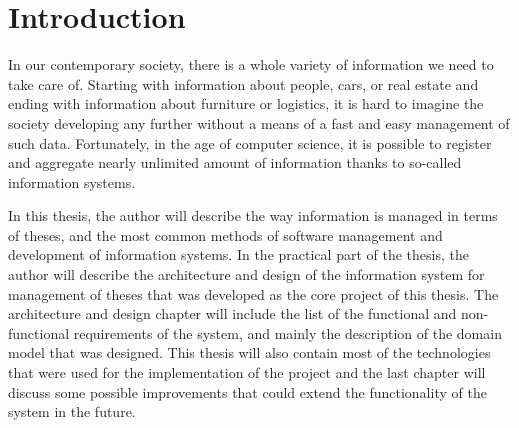 \chapter{Introduction}

In our contemporary society, there is a whole variety of information we need to take care of. Starting with information about people, cars, or real estate and ending with information about furniture or logistics, it is hard to imagine the society developing any further without a means of a fast and easy management of such data. Fortunately, in the age of computer science, it is possible to register and aggregate nearly unlimited amount of information thanks to so-called information systems.

In this thesis, the author will describe the way information is managed in terms of theses, and the most common methods of software management and development of information systems. In the practical part of the thesis, the author will describe the architecture and design of the information system for management of theses that was developed as the core project of this thesis. The architecture and design chapter will include the list of the functional and non-functional requirements of the system, and mainly the description of the domain model that was designed. This thesis will also contain most of the technologies that were used for the implementation of the project and the last chapter will discuss some possible improvements that could extend the functionality of the system in the future.
